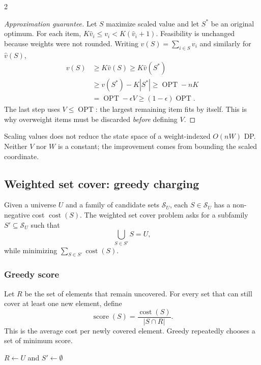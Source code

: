 \documentclass[10pt]{article}
\theoremstyle{definition}
\newcommand{\OPT}{\operatorname{OPT}}
\begin{document}
\begin{multicols*}{2}
\begin{proof}[Approximation guarantee]
Let $S$ maximize scaled value and let $S^*$ be an original optimum. For each item,
$K\hat v_i\le v_i<K(\hat v_i+1)$. Feasibility is unchanged because weights were not rounded.
Writing $v(S)=\sum_{i\in S}v_i$ and similarly for $\hat v(S)$,
\begin{align*}
v(S)&\ge K\hat v(S)\ge K\hat v(S^*)\\
&\ge v(S^*)-K|S^*|\ge\OPT-nK\\
&=\OPT-\epsilon V\ge(1-\epsilon)\OPT.
\end{align*}
The last step uses $V\le\OPT$: the largest remaining item fits by itself. This is why
overweight items must be discarded \emph{before} defining $V$.
\end{proof}
Scaling values does not reduce the state space of a weight-indexed $O(nW)$ DP. Neither
$V$ nor $W$ is a constant; the improvement comes from bounding the scaled coordinate.



\subsection{Weighted set cover: greedy charging}\label{gre:setcover}
Given a universe $U$ and a family of candidate sets $\mathcal{S}_U$, each
$S\in\mathcal{S}_U$ has a non-negative cost $\operatorname{cost}(S)$. The
weighted set cover problem asks for a subfamily $S'\subseteq\mathcal{S}_U$
such that
\[
  \bigcup_{S\in S'}S=U,
\]
while minimizing $\sum_{S\in S'}\operatorname{cost}(S)$.

\subsubsection*{Greedy score}
Let $R$ be the set of elements that remain uncovered. For every set that can
still cover at least one new element, define
\[
  \operatorname{score}(S)=
  \frac{\operatorname{cost}(S)}{|S\cap R|}.
\]
This is the average cost per newly covered element. Greedy repeatedly chooses
a set of minimum score.


\begin{algorithm}[H]
$R\gets U$ and $S'\gets\emptyset$\;
\;
\end{algorithm}


\end{multicols*}
\end{document}
